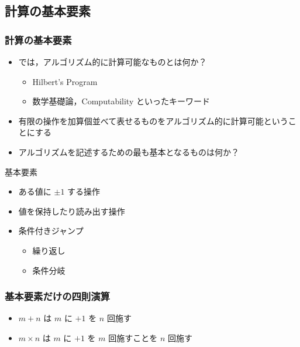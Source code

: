\subsection{計算の基本要素}
\begin{frame}
\frametitle{計算の基本要素}
  \begin{itemize}
\item では，アルゴリズム的に計算可能なものとは何か？
    \begin{itemize}
\item Hilbert's Program
\item 数学基礎論，Computability といったキーワード
    \end{itemize}
\item 有限の操作を加算個並べて表せるものをアルゴリズム的に計算可能ということにする
\item アルゴリズムを記述するための最も基本となるものは何か？
  \end{itemize}
  \begin{block}{基本要素}
    \begin{itemize}
\item ある値に \(\pm 1\) する操作
\item 値を保持したり読み出す操作
\item 条件付きジャンプ
      \begin{itemize}
\item 繰り返し
\item 条件分岐
      \end{itemize}
    \end{itemize}
  \end{block}
\end{frame}
\begin{frame}
\frametitle{基本要素だけの四則演算}
  \begin{itemize}
\item \(m+n\) は $m$ に \(+1\) を $n$ 回施す
\item \(m\times n\) は $m$ に \(+1\) を $m$ 回施すことを $n$ 回施す
  \end{itemize}
\end{frame}
